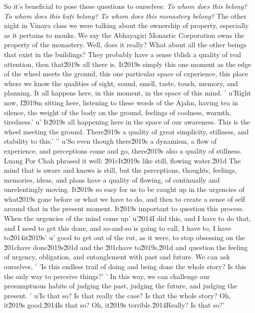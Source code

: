 So it's beneficial to pose these questions to ourselves: \emph{To whom 
does this belong? To whom does this kuṭi belong? To whom does this 
monastery belong?} The other night in Vinaya class we were talking 
about the ownership of property, especially as it pertains to monks. We 
say the Abhayagiri Monastic Corporation owns the property of the 
monastery. Well, does it really? What about all the other beings that 
exist in the buildings? They probably have a sense tblish a quality of real attention, then that\u2019s all there is. It\u2019s simply this one moment as the edge of the wheel meets the ground, this one particular space of experience, this place where we know the qualities of sight, sound, smell, taste, touch, memory, and planning. It all happens here, in this moment, in the space of this mind. '
u'Right now, I\u2019m sitting here, listening to these words of the Ajahn, having tea in silence, the weight of the body on the ground, feelings of coolness, warmth, tiredness.'
u' It\u2019s all happening here in the space of our awareness. This is the wheel meeting the ground. There\u2019s a quality of great simplicity, stillness, and stability to this.'
'\n'
u'So even though there\u2019s a dynamism, a flow of experience, and perceptions come and go, there\u2019s also a quality of stillness. Luang Por Chah phrased it well: \u201cIt\u2019s like still, flowing water.\u201d The mind that is aware and knows is still, but the perceptions, thoughts, feelings, memories, ideas, and plans have a quality of flowing, of continually and unrelentingly moving. It\u2019s so easy for us to be caught up in the urgencies of what\u2019s gone before or what we have to do, and then to create a sense of self around that in the present moment. It\u2019s important to question this process. When the urgencies of the mind come up'
u'\u2014I did this, and I have to do that, and I need to get this done, and so-and-so is going to call, I have to, I have to\u2014it\u2019s'
u' good to get out of the rut, as it were, to stop obsessing on the \u201chave done\u2019s\u201d and the \u201chave to\u2019s,\u201d and question the feeling of urgency, obligation, and entanglement with past and future. We can ask ourselves, '
'Is this endless trail of doing and being done the whole story? Is this the only way to perceive things?'
' In this way, we can challenge our presumptuous habits of judging the past, judging the future, and judging the present. '
u'Is that so? Is that really the case? Is that the whole story? Oh, it\u2019s good.\u2014Is that so? Oh, it\u2019s terrible.\u2014Really? Is that so?'
